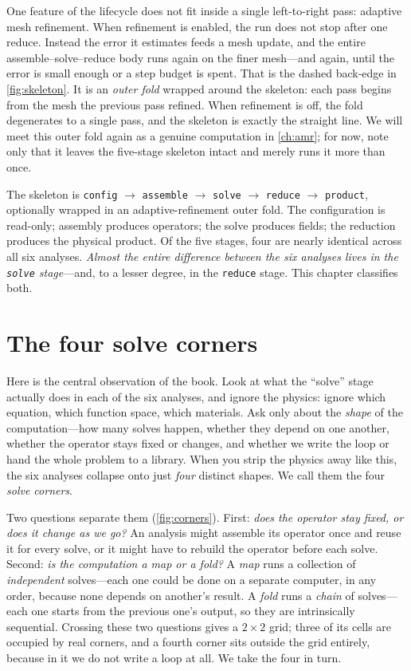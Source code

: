 One feature of the lifecycle does not fit inside a single left-to-right pass:
adaptive mesh refinement. When refinement is enabled, the run does not stop
after one reduce. Instead the error it estimates feeds a mesh update, and the
entire assemble--solve--reduce body runs again on the finer mesh---and again,
until the error is small enough or a step budget is spent. That is the dashed
back-edge in \cref{fig:skeleton}. It is an \emph{outer fold} wrapped around the
skeleton: each pass begins from the mesh the previous pass refined. When
refinement is off, the fold degenerates to a single pass, and the skeleton is
exactly the straight line. We will meet this outer fold again as a genuine
computation in \cref{ch:amr}; for now, note only that it leaves the
five-stage skeleton intact and merely runs it more than once.

\begin{keyidea}
The skeleton is \texttt{config} $\to$ \texttt{assemble} $\to$ \texttt{solve}
$\to$ \texttt{reduce} $\to$ \texttt{product},
optionally wrapped in an adaptive-refinement outer fold. The configuration is
read-only; assembly produces operators; the solve produces fields; the
reduction produces the physical product. Of the five stages, four are nearly
identical across all six analyses. \emph{Almost the entire difference between
the six analyses lives in the \texttt{solve} stage}---and, to a lesser degree,
in the \texttt{reduce} stage. This chapter classifies both.
\end{keyidea}

\section{The four solve corners}

Here is the central observation of the book. Look at what the ``solve'' stage
actually does in each of the six analyses, and ignore the physics: ignore which
equation, which function space, which materials. Ask only about the
\emph{shape} of the computation---how many solves happen, whether they depend on
one another, whether the operator stays fixed or changes, and whether we write
the loop or hand the whole problem to a library. When you strip the physics
away like this, the six analyses collapse onto just \emph{four} distinct shapes.
We call them the four \emph{solve corners}.

Two questions separate them (\cref{fig:corners}). First: \emph{does the operator
stay fixed, or does it change as we go?} An analysis might assemble its operator
once and reuse it for every solve, or it might have to rebuild the operator
before each solve. Second: \emph{is the computation a map or a fold?} A
\emph{map} runs a collection of \emph{independent} solves---each one could be
done on a separate computer, in any order, because none depends on another's
result. A \emph{fold} runs a \emph{chain} of solves---each one starts from the
previous one's output, so they are intrinsically sequential. Crossing these two
questions gives a $2\times 2$ grid; three of its cells are occupied by real
corners, and a fourth corner sits outside the grid entirely, because in it we do
not write a loop at all. We take the four in turn.


